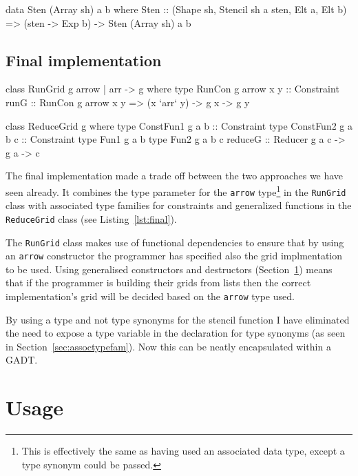 \documentclass[12pt,a4paper,twoside]{scrbook}
\begin{document}
\begin{hflisting}[label=lst:stendatafam,
caption=An example of a stencil data type for the GPU]
data Sten (Array sh) a b where
        Sten :: (Shape sh, Stencil sh a sten,
                 Elt a, Elt b) =>
                (sten -> Exp b)
                -> Sten (Array sh) a b
\end{hflisting}

\subsection{Final implementation}
\label{sec:final}

\begin{hflisting}[label=lst:final, caption={The final signatures of the
  \texttt{RunGrid} and \texttt{ReduceGrid} classes.}]
class RunGrid g arrow | arr -> g where
    type RunCon g arrow x y :: Constraint
    runG :: RunCon g arrow x y =>
            (x `arr` y)
            -> g x -> g y

class ReduceGrid g where
    type ConstFun1 g a b :: Constraint
    type ConstFun2 g a b c :: Constraint
    type Fun1 g a b
    type Fun2 g a b c
    reduceG :: Reducer g a c -> g a -> c
\end{hflisting}

The final implementation made a trade off between the two approaches we have
seen already. It combines the type parameter for the \texttt{arrow}
type\footnote{This is effectively the same as having used an associated data
  type, except a type synonym could be passed.} in the \texttt{RunGrid} class
with associated type families for constraints and generalized functions in the
\texttt{ReduceGrid} class (see Listing~\ref{lst:final}).

The \texttt{RunGrid} class makes use of functional dependencies to ensure that
by using an \texttt{arrow} constructor the programmer has specified also the
grid implmentation to be used. Using generalised constructors and destructors
(Section~\ref{sec:usage}) means that if the programmer is building their grids
from lists then the correct implementation's grid will be decided based on the
\texttt{arrow} type used.

By using a type and not type synonyms for the stencil function I have eliminated
the need to expose a type variable in the declaration for type synonyms (as seen
in Section~\ref{sec:assoctypefam}). Now this can be neatly encapsulated within a
GADT.

\section{Usage}
\label{sec:usage}
\end{document}
